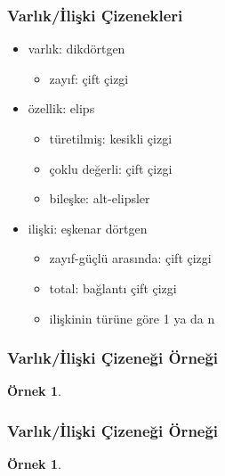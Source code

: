 \documentclass[dvipsnames]{beamer}
\theoremstyle{definition}
\theoremstyle{example}
\newtheorem{ornek}[theorem]{Örnek}
\theoremstyle{plain}
\begin{document}
\begin{frame}
  \frametitle{Varlık/İlişki Çizenekleri}

  \begin{itemize}
    \item varlık: dikdörtgen
    \begin{itemize}
      \item zayıf: çift çizgi
    \end{itemize}

    \pause
    \item özellik: elips
    \begin{itemize}
      \item türetilmiş: kesikli çizgi
      \item çoklu değerli: çift çizgi
      \item bileşke: alt-elipsler
    \end{itemize}

    \pause
    \item ilişki: eşkenar dörtgen
    \begin{itemize}
      \item zayıf-güçlü arasında: çift çizgi
      \item total: bağlantı çift çizgi
      \item ilişkinin türüne göre 1 ya da n
    \end{itemize}
 \end{itemize}
\end{frame}

\begin{frame}
  \frametitle{Varlık/İlişki Çizeneği Örneği}

  \begin{ornek}
    \begin{center}
    \end{center}
  \end{ornek}
\end{frame}

\begin{frame}
  \frametitle{Varlık/İlişki Çizeneği Örneği}

  \begin{ornek}
    \begin{center}
    \end{center}
  \end{ornek}
\end{frame}
\end{document}
